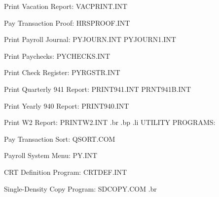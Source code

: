 Print Vacation Report:		  VACPRINT.INT

Pay Transaction Proof:		  HRSPROOF.INT

Print Payroll Journal:		  PYJOURN.INT
				  PYJOURN1.INT

Print Paychecks:		  PYCHECKS.INT

Print Check Register:		  PYRGSTR.INT

Print Quarterly 941 Report:	  PRINT941.INT
				  PRNT941B.INT

Print Yearly 940 Report:	  PRINT940.INT

Print W2 Report:		  PRINTW2.INT
.br
.bp
.li
UTILITY PROGRAMS:


Pay Transaction Sort:		  QSORT.COM

Payroll System Menu:		  PY.INT

CRT Definition Program: 	  CRTDEF.INT

Single-Density Copy Program:	  SDCOPY.COM
.br
